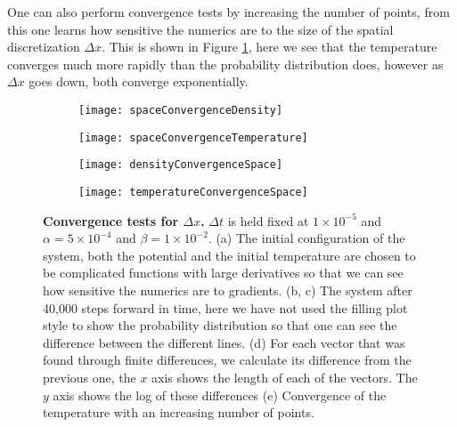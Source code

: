 One can also perform convergence tests by increasing the number of points, from this one learns how sensitive the numerics are to the size of the spatial discretization $\Delta x$. This is shown in Figure \ref{fig:spaceConvergence}, here we see that the temperature converges much more rapidly than the probability distribution does, however as $\Delta x$ goes down, both converge exponentially.

\begin{figure}

	\begin{subfigure}{0.49\textwidth}
		\texttt{[image: spaceConvergenceDensity]}
		\caption{}
	\end{subfigure}
	\begin{subfigure}{0.49\textwidth}
		\texttt{[image: spaceConvergenceTemperature]}
		\caption{}
	\end{subfigure}

	\begin{subfigure}{0.49\textwidth}
		\texttt{[image: densityConvergenceSpace]}
		\caption{}
	\end{subfigure}
	\begin{subfigure}{0.49\textwidth}
		\texttt{[image: temperatureConvergenceSpace]}
		\caption{}
	\end{subfigure}
\caption{\textbf{Convergence tests for $\Delta x$.} $\Delta t$ is held fixed at $1 \times 10^{-5}$ and $\alpha = 5 \times 10^{-4}$ and $\beta = 1 \times 10^{-2}$. (a) The initial configuration of the system, both the potential and the initial temperature are chosen to be complicated functions with large derivatives so that we can see how sensitive the numerics are to gradients. (b, c) The system after 40,000 steps forward in time, here we have not used the filling plot style to show the probability distribution so that one can see the difference between the different lines. (d) For each vector that was found through finite differences, we calculate its difference from the previous one, the $x$ axis shows the length of each of the vectors. The $y$ axis shows the log of these differences (e) Convergence of the temperature with an increasing number of points. \label{fig:spaceConvergence}}
\end{figure}